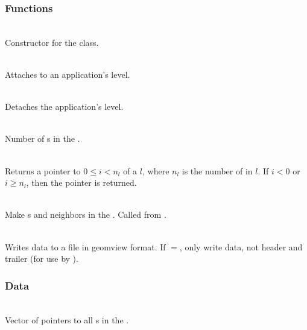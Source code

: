 \documentclass[11pt]{article}
\begin{document}
\subsubsection{ Functions}


     \\
    Constructor for the  class.

     \\
    Attaches to an application's level.

     \\
    Detaches the application's level.

     \\
    Number of s in the .

     \\ Returns a pointer
    to  $0 \le i < n_l$ of a  $l$, where
    $n_l$ is the number of  in $l$.  If $i <0 $ or $i \ge
    n_l$, then the  pointer is returned.

     \\
    Make s  and  neighbors in the .
    Called from .

     \\ Writes  data to a file in geomview format.
    If $=$, only write data, not header and
    trailer (for use by ).

\subsubsection{ Data}


     \\
    Vector of pointers to all s in the .
\end{document}
